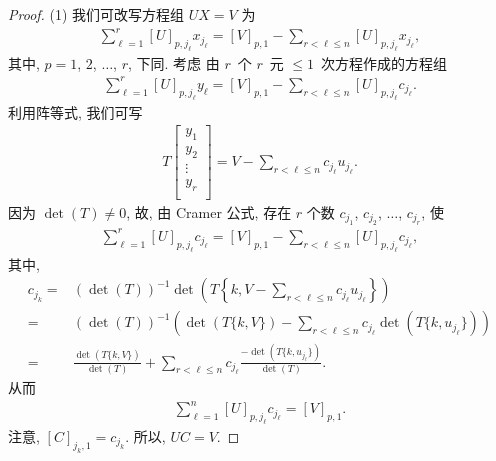 \documentclass[../libro.tex]{subfiles}
\begin{document}
\begin{proof}
    (1)
    我们可改写方程组 \(UX = V\) 为
    \begin{align*}
        \sum_{\ell = 1}^{r}
        {[U]_{p,j_\ell} x_{j_\ell}}
        = [V]_{p,1}
        - \sum_{r < \ell \leq n}
        {[U]_{p,j_\ell} x_{j_\ell}},
    \end{align*}
    其中, \(p = 1\), \(2\), \(\dots\), \(r\),
    下同.
    考虑%
    由 \(r\)~个 \(r\)~元 \({\leq} 1\)~次方程作成的方程组
    \begin{align*}
        \sum_{\ell = 1}^{r}
        {[U]_{p,j_\ell} y_\ell}
        = [V]_{p,1}
        - \sum_{r < \ell \leq n}
        {[U]_{p,j_\ell} c_{j_\ell}}.
    \end{align*}
    利用阵等式, 我们可写
    \begin{align*}
        T
        \begin{bmatrix}
            y_1    \\
            y_2    \\
            \vdots \\
            y_r    \\
        \end{bmatrix}
        =
        V -
        \sum_{r < \ell \leq n}
        {c_{j_\ell} u_{j_\ell}}.
    \end{align*}
    因为 \(\det {(T)} \neq 0\),
    故, 由 Cramer 公式,
    存在 \(r\) 个数
    \(c_{j_1}\), \(c_{j_2}\), \(\dots\), \(c_{j_r}\),
    使
    \begin{align*}
        \sum_{\ell = 1}^{r}
        {[U]_{p,j_\ell} c_{j_\ell}}
        = [V]_{p,1}
        - \sum_{r < \ell \leq n}
        {[U]_{p,j_\ell} c_{j_\ell}},
    \end{align*}
    其中,
    \begin{align*}
        c_{j_k}
        = {} &
        (\det {(T)})^{-1}
        \det {
            \left(
                T\left\{
                    k,
                    V -
                    \sum_{r < \ell \leq n}
                    {c_{j_\ell} u_{j_\ell}}
                \right\}
            \right)
        }
        \\
        = {} &
        (\det {(T)})^{-1}
        \left(
            \det {(T\{k,V\})}
            -
            \sum_{r < \ell \leq n}
            {c_{j_\ell}
                \det {(T\{k,u_{j_\ell}\})}
            }
        \right)
        \\
        = {} &
        \frac{\det {(T\{k,V\})}}{\det {(T)}}
        + \sum_{r < \ell \leq n}
        {c_{j_\ell}
        \frac{-\det {(T\{k,u_{j_\ell}\})}}{\det {(T)}}}.
    \end{align*}
    从而
    \begin{align*}
        \sum_{\ell = 1}^{n}
        {[U]_{p,j_\ell} c_{j_\ell}}
        = [V]_{p,1}.
    \end{align*}
    注意, \([C]_{j_k,1} = c_{j_k}\).
    所以, \(UC = V\).


\end{proof}
\end{document}
